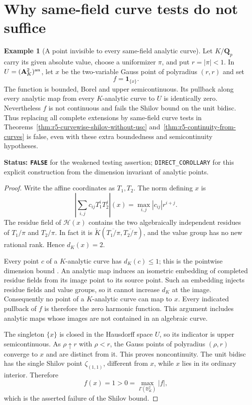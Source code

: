\documentclass[11pt,a4paper]{article}
\numberwithin{equation}{section}
\theoremstyle{definition}
\newtheorem{example}[theorem]{Example}
\theoremstyle{remark}
\begin{document}


\section{Why same-field curve tests do not suffice}
\label{sec:r5-curve-testing-scope-obstruction}

\begin{example}[A point invisible to every same-field analytic curve]
\label{ex:r5-same-field-curve-tests-false}
Let $K/\mathbf Q_p$ carry its given absolute value, choose a
uniformizer $\pi$, and put $r=|\pi|<1$.  In
$U=(\mathbf A_K^2)^{\rm an}$, let $x$ be the two-variable
Gauss point of polyradius $(r,r)$ and set
\[
                            f=\mathbf1_{\{x\}}.
\]
The function is bounded, Borel and upper semicontinuous.  Its
pullback along every analytic map from every $K$-analytic
curve to $U$ is identically zero.  Nevertheless $f$ is not
continuous and fails the Shilov bound on the unit bidisc.
Thus replacing all complete extensions by same-field curve
tests in Theorems~\ref{thm:r5-curvewise-shilov-without-usc}
and~\ref{thm:r5-continuity-from-curves} is false, even with
these extra boundedness and semicontinuity hypotheses.
\end{example}

\noindent\textbf{Status: \texttt{FALSE}} for the weakened
testing assertion; \texttt{DIRECT\_COROLLARY} for this explicit
construction from the dimension invariant of analytic points.

\begin{proof}
Write the affine coordinates as $T_1,T_2$.  The norm defining
$x$ is
\[
 \left|\sum_{i,j}c_{ij}T_1^iT_2^j\right|(x)
                   =\max_{i,j}|c_{ij}|r^{i+j}.
\]
The residue field of $\mathscr H(x)$ contains the two
algebraically independent residues of $T_1/\pi$ and
$T_2/\pi$.  In fact it is
$\widetilde K(\overline{T_1/\pi},\overline{T_2/\pi})$,
and the value group has no new rational rank.  Hence
$d_K(x)=2$.

Every point $c$ of a $K$-analytic curve has $d_K(c)\leq1$;
this is the pointwise dimension bound
\cite[\S1.4.6]{DucrosFamilies}.  An analytic map induces an
isometric embedding of completed residue fields from its image
point to its source point.  Such an embedding injects residue
fields and value groups, so it cannot increase $d_K$ at the
image.  Consequently no point of a $K$-analytic curve can
map to $x$.  Every indicated pullback of $f$ is therefore
the zero harmonic function.  This argument includes analytic
maps whose images are not contained in an algebraic curve.

The singleton $\{x\}$ is closed in the Hausdorff space $U$,
so its indicator is upper semicontinuous.  As $\rho\uparrow r$
with $\rho<r$, the Gauss points of polyradius $(\rho,r)$
converge to $x$ and are distinct from it.  This proves
noncontinuity.  The unit bidisc has the single Shilov point
$\zeta_{(1,1)}$, different from $x$, while $x$ lies in its
ordinary interior.  Therefore
\[
                  f(x)=1>0=\max_{\Gamma(\mathbb B_K^2)}|f|,
\]
which is the asserted failure of the Shilov bound.
\end{proof}
\end{document}
